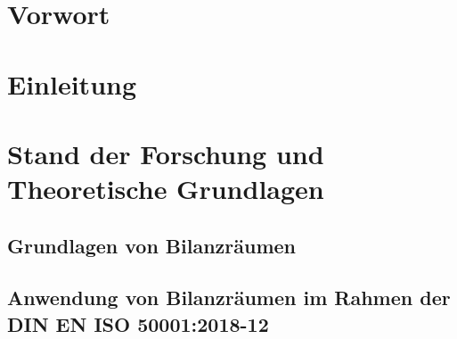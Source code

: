 \documentclass[a4paper,10pt,twoside]{report}
\begin{document}
\chapter*{Vorwort}
\tableofcontents

\chapter{Einleitung}
\setcounter{page}{1}














\chapter{Stand der Forschung und Theoretische Grundlagen}
\section{Grundlagen von Bilanzräumen}



\section{Anwendung von Bilanzräumen im Rahmen der DIN EN ISO 50001:2018-12}







\end{document}
